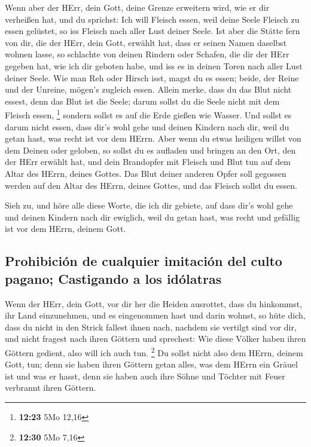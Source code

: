  Wenn aber der HErr, dein Gott, deine Grenze erweitern
wird, wie er dir verheißen hat, und du sprichst: Ich will Fleisch essen,
weil deine Seele Fleisch zu essen gelüstet, so iss Fleisch nach aller
Lust deiner Seele.  Ist aber die Stätte fern von dir, die
der HErr, dein Gott, erwählt hat, dass er seinen Namen daselbst wohnen
lasse, so schlachte von deinen Rindern oder Schafen, die dir der HErr
gegeben hat, wie ich dir geboten habe, und iss es in deinen Toren nach
aller Lust deiner Seele.  Wie man Reh oder Hirsch isst,
magst du es essen; beide, der Reine und der Unreine, mögen's zugleich
essen.  Allein merke, dass du das Blut nicht essest, denn
das Blut ist die Seele; darum sollst du die Seele nicht mit dem Fleisch
essen, \footnote{\textbf{12:23} 5Mo 12,16}  sondern
sollst es auf die Erde gießen wie Wasser.  Und sollst es
darum nicht essen, dass dir's wohl gehe und deinen Kindern nach dir,
weil du getan hast, was recht ist vor dem HErrn.  Aber
wenn du etwas heiligen willst von dem Deinen oder geloben, so sollst du
es aufladen und bringen an den Ort, den der HErr erwählt hat,
 und dein Brandopfer mit Fleisch und Blut tun auf dem
Altar des HErrn, deines Gottes. Das Blut deiner anderen Opfer soll
gegossen werden auf den Altar des HErrn, deines Gottes, und das Fleisch
sollst du essen.

 Sieh zu, und höre alle diese Worte, die ich dir gebiete,
auf dass dir's wohl gehe und deinen Kindern nach dir ewiglich, weil du
getan hast, was recht und gefällig ist vor dem HErrn, deinem Gott.

\hypertarget{prohibiciuxf3n-de-cualquier-imitaciuxf3n-del-culto-pagano-castigando-a-los-iduxf3latras}{%
\subsection{Prohibición de cualquier imitación del culto pagano;
Castigando a los
idólatras}\label{prohibiciuxf3n-de-cualquier-imitaciuxf3n-del-culto-pagano-castigando-a-los-iduxf3latras}}

 Wenn der HErr, dein Gott, vor dir her die Heiden
ausrottet, dass du hinkommst, ihr Land einzunehmen, und es eingenommen
hast und darin wohnst,  so hüte dich, dass du nicht in
den Strick fallest ihnen nach, nachdem sie vertilgt sind vor dir, und
nicht fragest nach ihren Göttern und sprechest: Wie diese Völker haben
ihren Göttern gedient, also will ich auch tun. \footnote{\textbf{12:30}
  5Mo 7,16}  Du sollst nicht also dem HErrn, deinem Gott,
tun; denn sie haben ihren Göttern getan alles, was dem HErrn ein Gräuel
ist und was er hasst, denn sie haben auch ihre Söhne und Töchter mit
Feuer verbrannt ihren Göttern.

